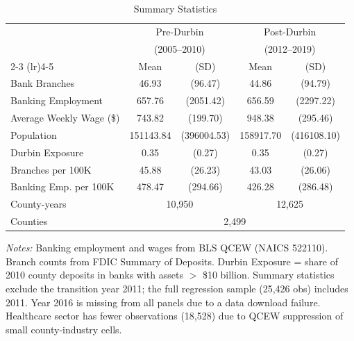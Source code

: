 \begin{table}[htbp]
\centering
\caption{Summary Statistics}
\label{tab:summary}
\begin{tabular}{lcccc}
\toprule
 & \multicolumn{2}{c}{Pre-Durbin} & \multicolumn{2}{c}{Post-Durbin} \\
 & \multicolumn{2}{c}{(2005--2010)} & \multicolumn{2}{c}{(2012--2019)} \\
\cmidrule(lr){2-3} \cmidrule(lr){4-5}
 & Mean & (SD) & Mean & (SD) \\
\midrule
Bank Branches & 46.93 & (96.47) & 44.86 & (94.79) \\
Banking Employment & 657.76 & (2051.42) & 656.59 & (2297.22) \\
Average Weekly Wage (\$) & 743.82 & (199.70) & 948.38 & (295.46) \\
Population & 151143.84 & (396004.53) & 158917.70 & (416108.10) \\
Durbin Exposure & 0.35 & (0.27) & 0.35 & (0.27) \\
Branches per 100K & 45.88 & (26.23) & 43.03 & (26.06) \\
Banking Emp. per 100K & 478.47 & (294.66) & 426.28 & (286.48) \\
\midrule
County-years & \multicolumn{2}{c}{10,950} & \multicolumn{2}{c}{12,625} \\
Counties & \multicolumn{4}{c}{2,499} \\
\bottomrule
\end{tabular}
\begin{minipage}{0.95\textwidth}
\vspace{0.5em}
\footnotesize \textit{Notes:} Banking employment and wages from BLS QCEW (NAICS 522110). Branch counts from FDIC Summary of Deposits. Durbin Exposure = share of 2010 county deposits in banks with assets $>$ \$10 billion. Summary statistics exclude the transition year 2011; the full regression sample (25,426 obs) includes 2011. Year 2016 is missing from all panels due to a data download failure. Healthcare sector has fewer observations (18,528) due to QCEW suppression of small county-industry cells.
\end{minipage}
\end{table}


